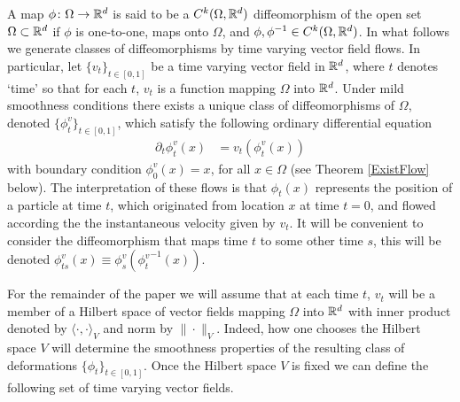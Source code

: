 \documentclass[noinfoline]{imsart}
\begin{document}
A map $\phi\colon \Omega \rightarrow\Bbb R^d$ is said to be a $C^k(\Omega,\Bbb R^d)$ diffeomorphism of the open set $\Omega \subset \Bbb R^d$ if  $\phi$ is one-to-one, maps onto $\Omega$, and  $\phi, \phi^{-1}\in C^{k}(\Omega,\Bbb R^d)$.  In what follows we generate classes of diffeomorphisms by time varying vector field flows. In particular, let  $\{ v_t\}_{t\in [0,1]}$  be a time varying vector field in $\Bbb R^d$, where $t$ denotes  `time' so that for each $t$, $v_t$ is a function mapping $\Omega$ into $\Bbb R^d$. Under mild smoothness conditions there exists a unique class of diffeomorphisms of $\Omega$, denoted $\{ \phi_t^v\}_{t\in [0,1]}$, which satisfy the following ordinary differential equation
\begin{align}
\label{ood}
 \partial_t \phi_t^v(x) &= v_t(\phi_t^v(x))
 \end{align}
 with boundary condition $\phi_0^v(x)=x$, for all $x\in \Omega$ (see Theorem \ref{ExistFlow} below). The interpretation of these flows is that $\phi_t(x)$ represents the position of a particle at time $t$, which originated from location $x$ at time $t=0$, and flowed according the the instantaneous velocity given by $v_t$. It will be convenient to consider the diffeomorphism that maps time $t$ to some other time $s$, this will be denoted $\phi_{ts}^{ v}(x)\equiv \phi_{s}^{v}( {\phi_{t}^{ v}}^{-1}(x)) $.

For the remainder of the paper we will assume that at each time $t$, $v_t$ will be a member of a  Hilbert space of vector fields mapping  $\Omega$ into $\Bbb R^d$ with inner product denoted by $\langle\cdot, \cdot \rangle_V$ and norm by $\|  \cdot \|_V$.
Indeed, how one chooses the Hilbert space $V$ will determine the smoothness properties of the resulting class of deformations $\{\phi_t\}_{t\in[0,1]}$.  Once the Hilbert space $V$ is fixed we can define the following set of time varying vector fields.
\end{document}
